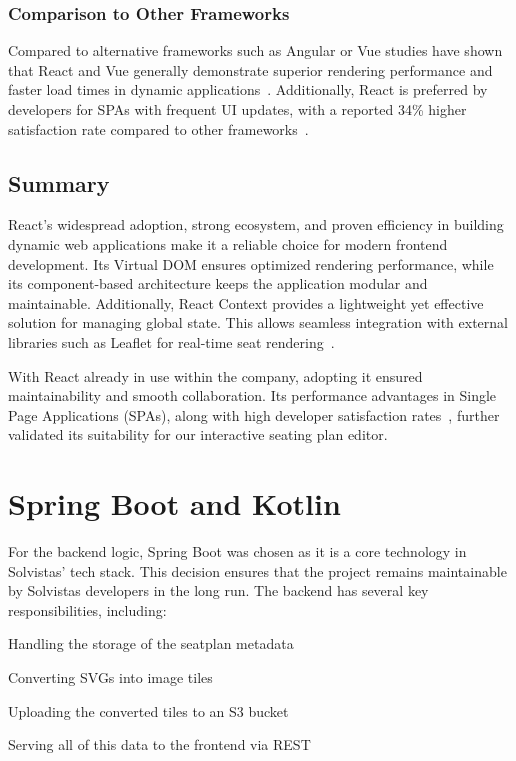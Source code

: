 \subsubsection{Comparison to Other Frameworks}
Compared to alternative frameworks such as Angular or Vue studies have shown that React and Vue generally demonstrate superior rendering performance and faster load times in dynamic applications~\cite{SPAComp}. Additionally, React is preferred by developers for SPAs with frequent UI updates, with a reported 34\% higher satisfaction rate compared to other frameworks~\cite{SPAComp}. 

\subsection{Summary}
React’s widespread adoption, strong ecosystem, and proven efficiency in building dynamic web applications make it a reliable choice for modern frontend development. Its Virtual DOM ensures optimized rendering performance, while its component-based architecture keeps the application modular and maintainable. Additionally, React Context provides a lightweight yet effective solution for managing global state. This allows seamless integration with external libraries such as Leaflet for real-time seat rendering~\cite{ReactVirtualDOM, ReactCBA01}. 

With React already in use within the company, adopting it ensured maintainability and smooth collaboration. Its performance advantages in Single Page Applications (SPAs), along with high developer satisfaction rates~\cite{SPAComp}, further validated its suitability for our interactive seating plan editor.

\section{Spring Boot and Kotlin}
For the backend logic, Spring Boot was chosen as it is a core technology in Solvistas' tech stack. This decision ensures that the project remains maintainable by Solvistas developers in the long run. The backend has several key responsibilities, including:\begin{compactitem}
    \item Handling the storage of the seatplan metadata
    \item Converting SVGs into image tiles
    \item Uploading the converted tiles to an S3 bucket
    \item Serving all of this data to the frontend via REST
\end{compactitem}

